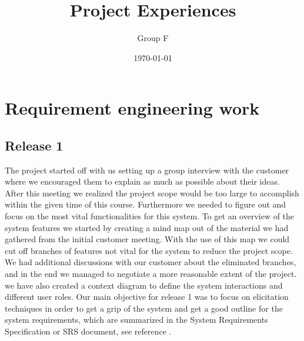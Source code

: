 \documentclass[10pt]{article}
\begin{document}
\makeatletter
\renewcommand{\@biblabel}[1]{\quad#1.}
\makeatother


\pagestyle{myheadings}





\begin{titlepage}
\title{Project Experiences}
\author{Group F}
\date{\today}
\maketitle
\thispagestyle{empty}
\end{titlepage}

\tableofcontents
\thispagestyle{empty}
\newpage
{}

\section{Requirement engineering work}

\subsection{Release 1}
The project started off with us setting up a group interview with the customer where we encouraged them to explain as much as possible about their ideas. After this meeting we realized the project scope would be too large to accomplish within the given time of this course. Furthermore we needed to figure out and focus on the most vital functionalities for this system.
To get an overview of the system features we started by creating a mind map out of the material we had gathered from the initial customer meeting. With the use of this map we could cut off branches of features not vital for the system to reduce the project scope.
We had additional discussions with our customer about the eliminated branches, and in the end we managed to negotiate a more reasonable extent of the project.
\newline we have also created a context diagram to define the system interactions and different user roles.
Our main objective for release 1 was to focus on elicitation techniques in order to get a grip of the system and get a good outline for the system requirements, which are summarized in the System Requirements Specification or SRS document, see reference \cite{srs}.
\end{document}
